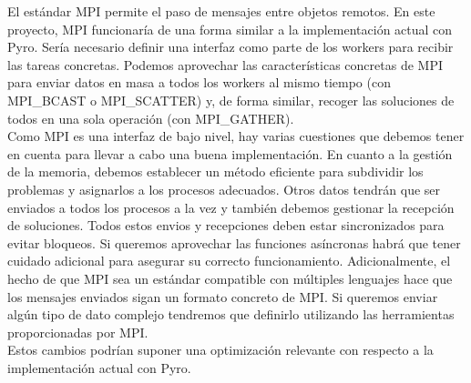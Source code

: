 El estándar MPI permite el paso de mensajes entre objetos remotos. En este proyecto, MPI funcionaría de una forma similar a la implementación actual con Pyro. Sería necesario definir una interfaz como parte de los workers para recibir las tareas concretas. Podemos aprovechar las características concretas de MPI para enviar datos en masa a todos los workers al mismo tiempo (con MPI\_BCAST o MPI\_SCATTER) y, de forma similar, recoger las soluciones de todos en una sola operación (con MPI\_GATHER).\\

Como MPI es una interfaz de bajo nivel, hay varias cuestiones que debemos tener en cuenta para llevar a cabo una buena implementación. En cuanto a la gestión de la memoria, debemos establecer un método eficiente para subdividir los problemas y asignarlos a los procesos adecuados. Otros datos tendrán que ser enviados a todos los procesos a la vez y también debemos gestionar la recepción de soluciones. Todos estos envios y recepciones deben estar sincronizados para evitar bloqueos. Si queremos aprovechar las funciones asíncronas habrá que tener cuidado adicional para asegurar su correcto funcionamiento. Adicionalmente, el hecho de que MPI sea un estándar compatible con múltiples lenguajes hace que los mensajes enviados sigan un formato concreto de MPI. Si queremos enviar algún tipo de dato complejo tendremos que definirlo utilizando las herramientas proporcionadas por MPI.\\

Estos cambios podrían suponer una optimización relevante con respecto a la implementación actual con Pyro.